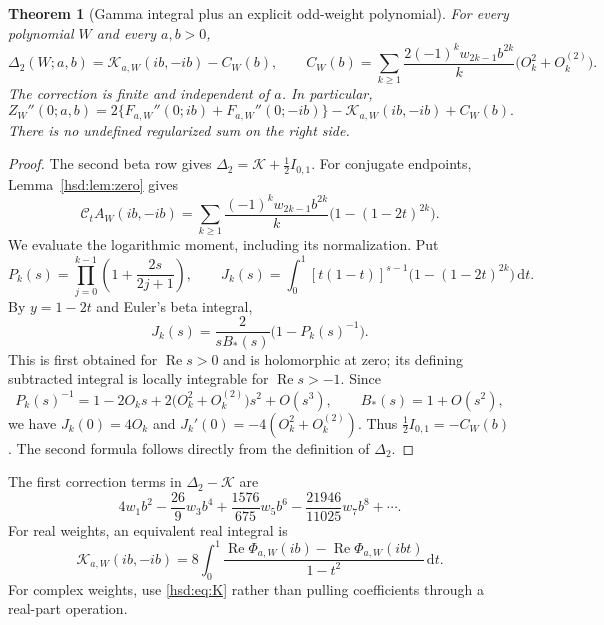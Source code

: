 \documentclass[11pt]{article}
\numberwithin{equation}{section}
\newtheorem{theorem}{Theorem}[section]
\theoremstyle{definition}\newtheorem{definition}[theorem]{Definition}
\theoremstyle{remark}\newtheorem{remark}[theorem]{Remark}
\DeclareMathOperator{\Rea}{Re}
\newcommand{\dd}{\,\mathrm d}
\newcommand{\CC}{\mathcal C}
\newcommand{\KK}{\mathcal K}
\begin{document}
\begin{theorem}[Gamma integral plus an explicit odd-weight polynomial]
\label{hsd:thm:gamma-second}
For every polynomial $W$ and every $a,b>0$,
\begin{equation}\label{hsd:eq:second-main}
 \boxed{\displaystyle
 \Delta_2(W;a,b)=\KK_{a,W}(ib,-ib)-C_W(b),\qquad
 C_W(b)=\sum_{k\ge1}\frac{2(-1)^kw_{2k-1}b^{2k}}k
                         \bigl(O_k^2+O_k^{(2)}\bigr).}
\end{equation}
The correction is finite and independent of $a$. In particular,
\begin{equation}\label{hsd:eq:quadratic-second-finite}
 Z_W''(0;a,b)=2\{F_{a,W}''(0;ib)+F_{a,W}''(0;-ib)\}
                      -\KK_{a,W}(ib,-ib)+C_W(b).
\end{equation}
There is no undefined regularized sum on the right side.
\end{theorem}
\begin{proof}
The second beta row gives
$\Delta_2=\KK+\tfrac12 I_{0,1}$. For conjugate endpoints,
Lemma~\ref{hsd:lem:zero} gives
\[
 \CC_tA_W(ib,-ib)=\sum_{k\ge1}
       \frac{(-1)^kw_{2k-1}b^{2k}}k\bigl(1-(1-2t)^{2k}\bigr).
\]
We evaluate the logarithmic moment, including its normalization.
Put
\[
 P_k(s)=\prod_{j=0}^{k-1}\left(1+\frac{2s}{2j+1}\right),\qquad
 J_k(s)=\int_0^1[t(1-t)]^{s-1}\bigl(1-(1-2t)^{2k}\bigr)\dd t.
\]
By $y=1-2t$ and Euler's beta integral,
\begin{equation}\label{hsd:eq:Jk}
 J_k(s)=\frac{2}{sB_*(s)}\bigl(1-P_k(s)^{-1}\bigr).
\end{equation}
This is first obtained for $\Rea s>0$ and is holomorphic at zero;
its defining subtracted integral is locally integrable for $\Rea s>-1$.
Since
\[
 P_k(s)^{-1}=1-2O_ks+2\bigl(O_k^2+O_k^{(2)}\bigr)s^2+O(s^3),
 \qquad B_*(s)=1+O(s^2),
\]
we have $J_k(0)=4O_k$ and
$J_k'(0)=-4(O_k^2+O_k^{(2)})$. Thus
$\tfrac12I_{0,1}=-C_W(b)$. The second formula follows directly from the
definition of $\Delta_2$.
\end{proof}

The first correction terms in $\Delta_2-\KK$ are
\begin{equation}\label{hsd:eq:local-examples}
 4w_1b^2-\frac{26}{9}w_3b^4+\frac{1576}{675}w_5b^6
                         -\frac{21946}{11025}w_7b^8+\cdots.
\end{equation}
For real weights, an equivalent real integral is
\begin{equation}\label{hsd:eq:Kreal}
 \KK_{a,W}(ib,-ib)=8\int_0^1
 \frac{\Rea\Phi_{a,W}(ib)-\Rea\Phi_{a,W}(ibt)}{1-t^2}\dd t.
\end{equation}
For complex weights, use \eqref{hsd:eq:K} rather than pulling coefficients
through a real-part operation.
\end{document}
